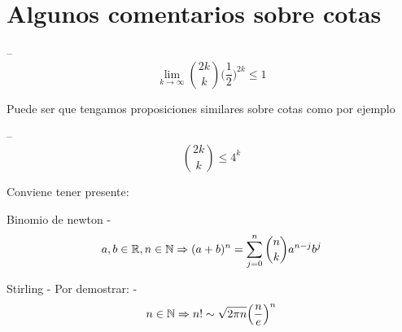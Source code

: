 \section{Algunos comentarios sobre cotas}

\begin{Proposition}
    -- $$ \lim_{k \to \infty} \binom{2k}{k} \Big( \frac{1}{2} \Big)^{2k}  \leq 1 $$ 
\end{Proposition}

Puede ser que tengamos proposiciones similares sobre cotas como por ejemplo

\begin{Proposition}
    -- $$ \binom{2k}{k} \leq 4^k$$ 
\end{Proposition}

Conviene tener presente:
\begin{Theorem}{Binomio de newton}
    - $$a, b \in \mathbb{R}, n \in \mathbb{N} \Rightarrow (a+b)^n = \sum_{j=0}^n \binom{n}{k} a^{n-j}b^j$$
\end{Theorem}

\begin{Proposition}{Stirling}
    - Por demostrar:
    - $$n \in \mathbb{N} \Rightarrow n! \sim \sqrt{2\pi n } \Big( \frac{n}{e} \Big)^n $$

\end{Proposition}